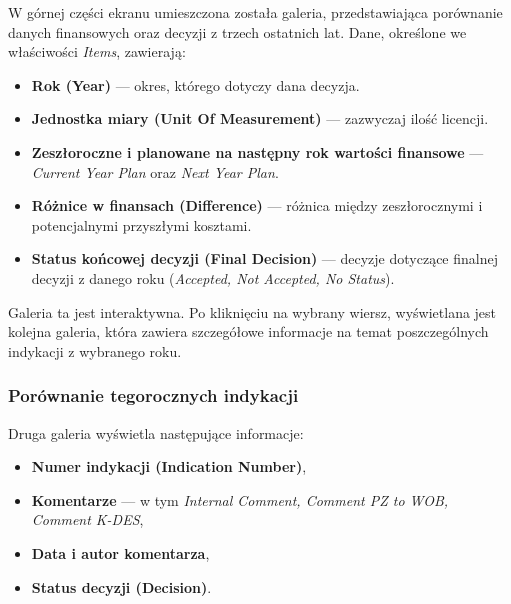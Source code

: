 W górnej części ekranu umieszczona została galeria, przedstawiająca porównanie danych finansowych oraz decyzji z trzech ostatnich lat. Dane, określone we właściwości \emph{Items}, zawierają:

\begin{itemize}
\item \textbf{Rok (Year)} — okres, którego dotyczy dana decyzja.
\item \textbf{Jednostka miary (Unit Of Measurement)} — zazwyczaj ilość licencji.
\item \textbf{Zeszłoroczne i planowane na następny rok wartości finansowe} — \emph{Current Year Plan} oraz \emph{Next Year Plan}.
\item \textbf{Różnice w finansach (Difference)} — różnica między zeszłorocznymi i potencjalnymi przyszłymi kosztami.
\item \textbf{Status końcowej decyzji (Final Decision)} — decyzje dotyczące finalnej decyzji z danego roku (\emph{Accepted, Not Accepted, No Status}).
\end{itemize}




Galeria ta jest interaktywna. Po kliknięciu na wybrany wiersz, wyświetlana jest kolejna galeria, która zawiera szczegółowe informacje na temat poszczególnych indykacji z wybranego roku.

\subsubsection*{Porównanie tegorocznych indykacji}

Druga galeria wyświetla następujące informacje:
\begin{itemize}
\item \textbf{Numer indykacji (Indication Number)},
\item \textbf{Komentarze} — w tym \emph{Internal Comment, Comment PZ to WOB, Comment K-DES},
\item \textbf{Data i autor komentarza},
\item \textbf{Status decyzji (Decision)}.
\end{itemize}

